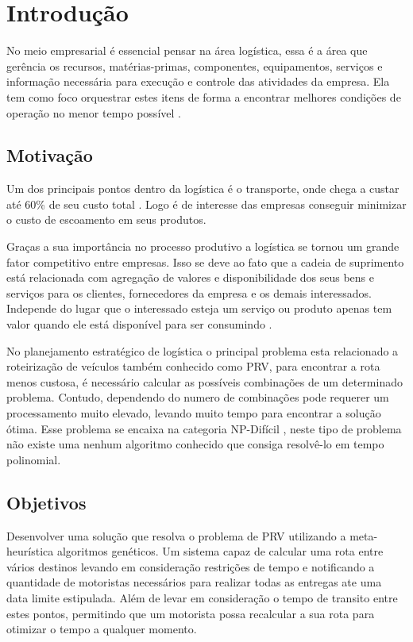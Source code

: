 \chapter[Introdução]{Introdução}

No meio empresarial é essencial pensar na área logística, essa é a área que gerência os recursos, matérias-primas, componentes, equipamentos, serviços e informação necessária para execução e controle das atividades da empresa. Ela tem como foco orquestrar estes itens de forma a encontrar
melhores condições de operação no menor tempo possível \cite{DIAS}.

\section{Motivação}

Um dos principais pontos dentro da logística é o transporte, onde chega a custar até 60\% de seu custo total \cite{RODRIGUES}.
Logo é de interesse das empresas conseguir minimizar o custo de escoamento em seus produtos.

Graças a sua importância no processo produtivo a logística se tornou um grande fator competitivo entre empresas.
Isso se deve ao fato que a cadeia de suprimento está relacionada com agregação de valores e disponibilidade dos seus bens e
serviços para os clientes, fornecedores da empresa e os demais interessados. 
Independe do lugar que o interessado esteja um serviço ou produto apenas tem valor quando ele está disponível para ser consumindo \cite{TSUDA}.

No planejamento estratégico de logística o principal problema esta relacionado a roteirização de veículos \cite{TSUDA} também conhecido como PRV, para encontrar a rota menos custosa, é necessário calcular as possíveis combinações de um determinado problema. 
Contudo, dependendo do numero de combinações pode requerer um processamento muito elevado, levando muito tempo para encontrar a solução ótima.
Esse problema se encaixa na categoria NP-Difícil \cite{CUNHA}, neste tipo de problema não existe uma nenhum algoritmo conhecido que consiga resolvê-lo em tempo polinomial.

\section{Objetivos}

Desenvolver uma solução que resolva o problema de PRV utilizando a meta-heurística algoritmos genéticos. Um sistema capaz de calcular uma rota entre vários destinos 
levando em consideração restrições de tempo e notificando a quantidade de motoristas necessários para realizar todas as entregas ate uma data limite estipulada. Além de levar  
em consideração o tempo de transito entre estes pontos, permitindo que um motorista possa recalcular a sua rota para otimizar o tempo a qualquer momento.

